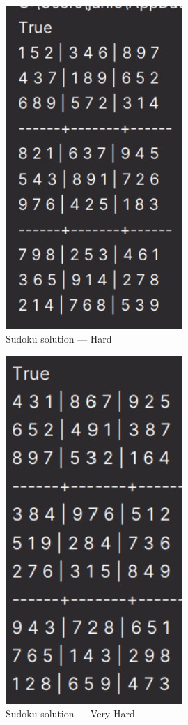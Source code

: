 \documentclass[11pt]{article}
\begin{document}
\begin{figure}[H]
    \centering
    \includegraphics[width=0.6\textwidth]{images/sudoko_hard}
    \caption{Sudoku solution — Hard}
\end{figure}

\begin{figure}[H]
    \centering
    \includegraphics[width=0.6\textwidth]{images/sudoko_very_hard}
    \caption{Sudoku solution — Very Hard}
\end{figure}
\end{document}
